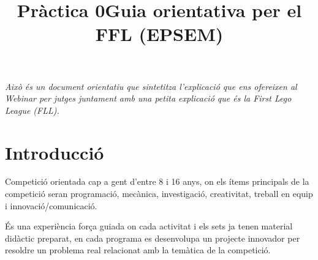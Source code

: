 \documentclass{article}
\title{Pràctica 0}
\begin{document}
\title{Guia orientativa per el FFL (EPSEM)}

\hfill
\textit{Això és un document orientatiu que sintetitza l'explicació que ens ofereixen al Webinar per jutges\cite{Webinar} juntament amb una petita explicació que és la First Lego League (FLL)\cite{FFL}.}
\hfill 

\section{Introducció}
\hfill

Competició orientada cap a gent d’entre 8 i 16 anys, on els ítems principals de la competició seran programació, mecànica, investigació, creativitat, treball en equip i innovació/comunicació. 

\hfill \break\hfill \break
És una experiència força guiada on cada activitat i els sets ja tenen material didàctic preparat, en cada programa es desenvolupa un projecte innovador per resoldre un problema real relacionat amb la temàtica de la competició.
\end{document}
